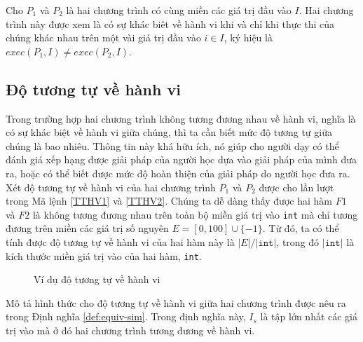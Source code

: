 \begin{definition}
  \label{def:equiv-diff}
  Cho $P_{1}$ và $P_{2}$ là hai chương trình có cùng miền các giá trị
  đầu vào $I$. Hai chương trình này được xem là có sự khác biêt về
  hành vi khi và chỉ khi thực thi của chúng khác nhau trên một vài giá
  trị đầu vào $i \in I$, ký hiệu là
  $exec(P_{1}, I) \neq exec(P_{2}, I)$.
\end{definition}

\subsection{Độ tương tự về hành vi}

Trong trường hợp hai chương trình không tương đương nhau về hành vi,
nghĩa là có sự khác biệt về hành vi giữa chúng, thì ta cần biết mức độ
tương tự giữa chúng là bao nhiêu. Thông tin này khá hữu ích, nó giúp
cho người dạy có thể đánh giá xếp hạng được giải pháp của người học
dựa vào giải pháp của mình đưa ra, hoặc có thể biết được mức độ hoàn
thiện của giải pháp do người học đưa ra. Xét độ tương tự về hành vi
của hai chương trình $P_{1}$ và $P_{2}$ được cho lần lượt trong Mã
lệnh \ref{TTHV1} và \ref{TTHV2}. Chúng ta dễ dàng thấy được hai hàm
$F1$ và $F2$ là không tương đương nhau trên toàn bộ miền giá trị vào
\texttt{int} mà chỉ tương đương trên miền các giá trị số nguyên
$E = [0,100] \cup \{-1\}$. Từ đó, ta có thể tính được độ tương tự về
hành vi của hai hàm này là $|E| / |\texttt{int}|$, trong đó
$|\mathtt{int}|$ là kích thước miền giá trị vào của hai hàm,
\texttt{int}.

\begin{figure}[H]
	\centering
	\caption{Ví dụ độ tương tự về hành vi}
	\label{fig:behavioral-sim}
	\begin{minipage}[t]{0.45\linewidth}
	  
	\end{minipage}%
	\hfill\vrule\hfill
	\begin{minipage}[t]{0.45\linewidth}
	  
	\end{minipage}%
\end{figure}

Mô tả hình thức cho độ tương tự về hành vi giữa hai chương trình được
nêu ra trong Định nghĩa \ref{def:equiv-sim}. Trong định nghĩa này,
$I_s$ là tập lớn nhất các giá trị vào mà ở đó hai chương trình tương
đương về hành vi.
    
